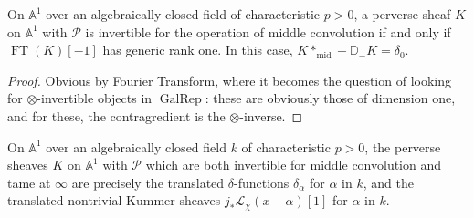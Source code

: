 On \(\mathbb{A}^1\) over an algebraically closed field of characteristic
\(p>0\), a perverse sheaf \(K\) on \(\mathbb{A}^1\) with \(\mathcal{P}\) is
invertible for the operation of middle convolution if and only if
\(\operatorname{FT}(K)[-1]\) has generic rank one. In this case,
\(K*_{\mathrm{mid}}+\mathbb{D}_{-}K=\delta_0\).

\begin{proof}
Obvious by Fourier Transform, where it becomes the question of looking for
\(\otimes\)-invertible objects in \(\operatorname{GalRep}\): these are
obviously those of dimension one, and for these, the contragredient is the
\(\otimes\)-inverse.
\end{proof}

On \(\mathbb{A}^1\) over an algebraically closed field \(k\) of characteristic
\(p>0\), the perverse sheaves \(K\) on \(\mathbb{A}^1\) with \(\mathcal{P}\)
which are both invertible for middle convolution and tame at \(\infty\) are
precisely the translated \(\delta\)-functions \(\delta_\alpha\) for \(\alpha\)
in \(k\), and the translated nontrivial Kummer sheaves
\(j_*\mathcal{L}_\chi(x-\alpha)[1]\) for \(\alpha\) in \(k\).

